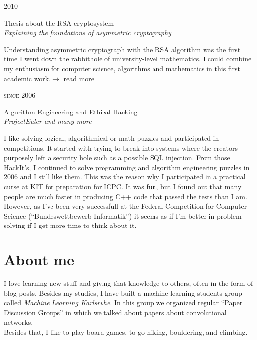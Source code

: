 \documentclass[a4paper,10pt]{article} %
\begin{document}
{\begin{minipage}[t]{0.5\textwidth}

{\raggedleft\textsc{2010}\par}

{\raggedright\large Thesis about the RSA cryptosystem\\
\textit{Explaining the foundations of asymmetric cryptography}\\[5pt]}

\normalsize{Understanding asymmetric cryptograph with the RSA algorithm was the
first time I went down the rabbithole of university-level mathematics. I could
combine my enthusiasm for computer science, algorithms and mathematics in this
first academic work.}\hfill \href{http://www.martin-thoma.de/Facharbeit-Martin-Thoma-2.pdf}{$\rightarrow$ read more}\\


{\raggedleft\textsc{since 2006}\par}

{\raggedright\large Algorithm Engineering and Ethical Hacking\\
\textit{ProjectEuler and many more}\\[5pt]}

\normalsize{I like solving logical, algorithmical or math
puzzles and participated in competitions. It started with trying to break into
systems where the creators purposely left a security hole such as a possible
SQL injection. From those HackIt's, I continued to solve programming and
algorithm engineering puzzles in 2006 and I still like them. This was the
reason why I participated in a practical curse at KIT for preparation for ICPC.
It was fun, but I found out that many people are much faster in producing C++
code that passed the tests than I am. However, as I've been very successfull at
the Federal Competition for Computer Science (``Bundeswettbewerb Informatik'')
it seems as if I'm better in problem solving if I get more time to think about
it.}\\

\section{About me}
I love learning new stuff and giving that knowledge to others, often in the
form of blog posts. Besides my studies, I have built a machine learning
students group called \textit{Machine Learning Karlsruhe}. In this
group we organized regular \enquote{Paper Discussion Groups} in which we talked
about papers about convolutional networks.\\
Besides that, I like to play board games, to go hiking, bouldering, and climbing.


\end{minipage}}
\end{document}

